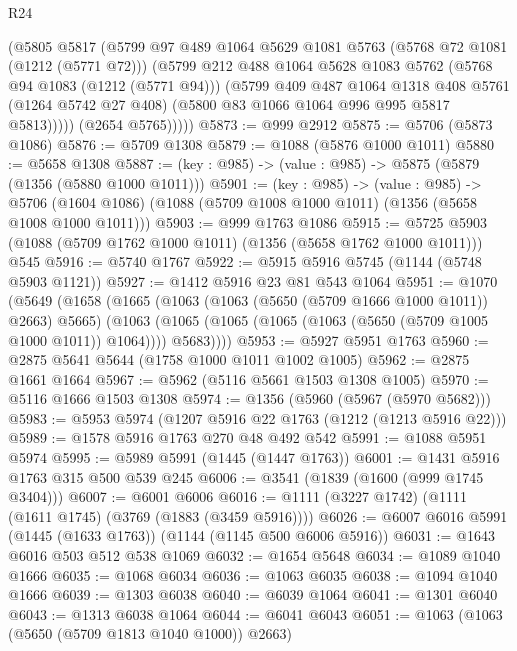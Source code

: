 \begin{lexlean}{R24}
\begin{coremodule}
            (@5805
              @5817
              (@5799
                @97
                @489
                @1064
                @5629
                @1081
                @5763
                (@5768 @72 @1081 (@1212 (@5771 @72)))
                (@5799
                  @212
                  @488
                  @1064
                  @5628
                  @1083
                  @5762
                  (@5768 @94 @1083 (@1212 (@5771 @94)))
                  (@5799
                    @409
                    @487
                    @1064
                    @1318
                    @408
                    @5761
                    (@1264 @5742 @27 @408)
                    (@5800 @83 @1066 @1064 @996 @995 @5817 @5813)))))
            (@2654 @5765)))))
@5873 := @999 @2912
@5875 := @5706 (@5873 @1086)
@5876 := @5709 @1308
@5879 := @1088 (@5876 @1000 @1011)
@5880 := @5658 @1308
@5887 := (key : @985) -> (value : @985) -> @5875 (@5879 (@1356 (@5880 @1000 @1011)))
@5901 := (key : @985) ->
  (value : @985) ->
  @5706 (@1604 @1086) (@1088 (@5709 @1008 @1000 @1011) (@1356 (@5658 @1008 @1000 @1011)))
@5903 := @999 @1763 @1086
@5915 := @5725 @5903 (@1088 (@5709 @1762 @1000 @1011) (@1356 (@5658 @1762 @1000 @1011))) @545
@5916 := @5740 @1767
@5922 := @5915 @5916 @5745 (@1144 (@5748 @5903 @1121))
@5927 := @1412 @5916 @23 @81 @543 @1064
@5951 := @1070
    (@5649
      (@1658
        (@1665
          (@1063 (@1063 (@5650 (@5709 @1666 @1000 @1011)) @2663) @5665)
          (@1063 (@1065 (@1065 (@1065 (@1063 (@5650 (@5709 @1005 @1000 @1011)) @1064)))) @5683))))
@5953 := @5927 @5951 @1763
@5960 := @2875 @5641 @5644 (@1758 @1000 @1011 @1002 @1005)
@5962 := @2875 @1661 @1664
@5967 := @5962 (@5116 @5661 @1503 @1308 @1005)
@5970 := @5116 @1666 @1503 @1308
@5974 := @1356 (@5960 (@5967 (@5970 @5682)))
@5983 := @5953 @5974 (@1207 @5916 @22 @1763 (@1212 (@1213 @5916 @22)))
@5989 := @1578 @5916 @1763 @270 @48 @492 @542
@5991 := @1088 @5951 @5974
@5995 := @5989 @5991 (@1445 (@1447 @1763))
@6001 := @1431 @5916 @1763 @315 @500 @539 @245
@6006 := @3541 (@1839 (@1600 (@999 @1745 @3404)))
@6007 := @6001 @6006
@6016 := @1111 (@3227 @1742) (@1111 (@1611 @1745) (@3769 (@1883 (@3459 @5916))))
@6026 := @6007 @6016 @5991 (@1445 (@1633 @1763)) (@1144 (@1145 @500 @6006 @5916))
@6031 := @1643 @6016 @503 @512 @538 @1069
@6032 := @1654 @5648
@6034 := @1089 @1040 @1666
@6035 := @1068 @6034
@6036 := @1063 @6035
@6038 := @1094 @1040 @1666
@6039 := @1303 @6038
@6040 := @6039 @1064
@6041 := @1301 @6040
@6043 := @1313 @6038 @1064
@6044 := @6041 @6043
@6051 := @1063 (@1063 (@5650 (@5709 @1813 @1040 @1000)) @2663)

\end{coremodule}
\end{lexlean}
